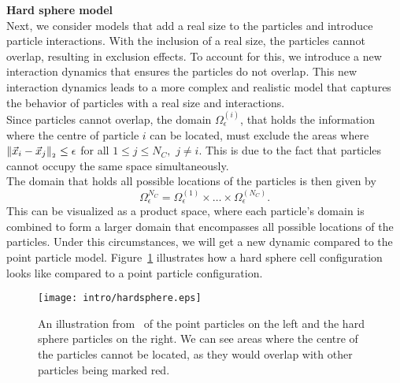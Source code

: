\textbf{Hard sphere model} \\
Next, we consider models that add a real size to the particles and introduce particle interactions. 
With the inclusion of a real size, the particles cannot overlap, resulting in exclusion effects. 
To account for this, we introduce a new interaction dynamics that ensures the particles do not overlap. 
This new interaction dynamics leads to a more complex and realistic model that captures the behavior of particles with a real size and interactions. \\
Since particles cannot overlap, the domain $\Omega^{(i)}_{\epsilon}$, that holds the information where the centre of particle $i$ can be located, must exclude the areas where $\norm[\vec{x}_i - \vec{x}_j] \leq \epsilon$ for all $1 \leq j \leq N_C,$ $j \neq i$. 
This is due to the fact that particles cannot occupy the same space simultaneously. \\
The domain that holds all possible locations of the particles is then given by \[\Omega^{N_C}_{\epsilon} = \Omega^{(1)}_{\epsilon} \times \ldots \times \Omega^{(N_C)}_{\epsilon} .\] 
This can be visualized as a product space, where each particle's domain is combined to form a larger domain that encompasses all possible locations of the particles.
Under this circumstances, we will get a new dynamic compared to the point particle model.  
Figure~\ref{fig:hardsphere} illustrates how a hard sphere cell configuration looks like compared to a point particle configuration. \\

\begin{figure}[h!]
	\centering
	\texttt{[image: intro/hardsphere.eps]}
	\caption{An illustration from~\cite{Bruna2012} of the point particles on the left and the hard sphere particles on the right. We can see areas where the centre of the particles cannot be located, as they would overlap with other particles being marked red. 
	}
	\label{fig:hardsphere}
\end{figure}

